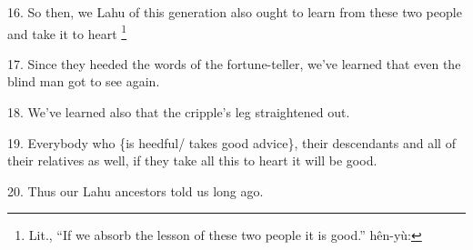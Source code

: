 16. So then, we Lahu of this generation also ought to learn from these two people
and take it to heart \.\footnote{Lit., ``If we absorb the lesson of these two people it is good.'' hên-yù:}

17. Since they heeded the words of the fortune-teller, we've learned that even
the blind man got to see again.

18. We've learned also that the cripple's leg straightened out.

19. Everybody who \{is heedful/ takes good advice\}, their descendants and all
of their relatives as well, if they take all this to heart it will be good.

20. Thus our Lahu ancestors told us long ago.

